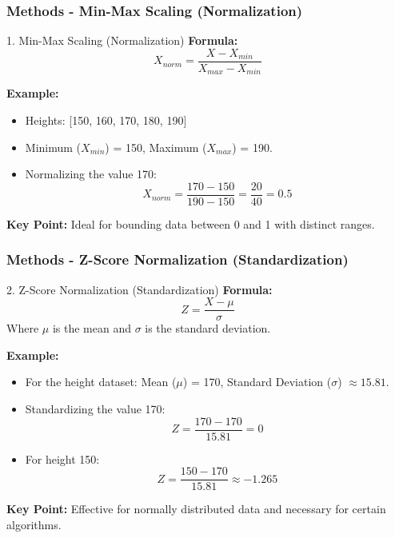 \documentclass[aspectratio=169]{beamer}
\begin{document}
\begin{frame}[fragile]
    \frametitle{Methods - Min-Max Scaling (Normalization)}
    \begin{block}{1. Min-Max Scaling (Normalization)}
        \textbf{Formula:} 
        \begin{equation}
            X_{norm} = \frac{X - X_{min}}{X_{max} - X_{min}}
        \end{equation}

        \textbf{Example:}
        \begin{itemize}
            \item Heights: [150, 160, 170, 180, 190]
            \item Minimum (\(X_{min}\)) = 150, Maximum (\(X_{max}\)) = 190.
            \item Normalizing the value 170:
            \begin{equation}
                X_{norm} = \frac{170 - 150}{190 - 150} = \frac{20}{40} = 0.5
            \end{equation}
        \end{itemize}
        \textbf{Key Point:} Ideal for bounding data between 0 and 1 with distinct ranges.
    \end{block}
\end{frame}

\begin{frame}[fragile]
    \frametitle{Methods - Z-Score Normalization (Standardization)}
    \begin{block}{2. Z-Score Normalization (Standardization)}
        \textbf{Formula:} 
        \begin{equation}
            Z = \frac{X - \mu}{\sigma}
        \end{equation}
        Where \( \mu \) is the mean and \( \sigma \) is the standard deviation.

        \textbf{Example:}
        \begin{itemize}
            \item For the height dataset: Mean (\(\mu\)) = 170, Standard Deviation (\(\sigma\)) \(\approx 15.81\).
            \item Standardizing the value 170:
            \begin{equation}
                Z = \frac{170 - 170}{15.81} = 0
            \end{equation}
            \item For height 150:
            \begin{equation}
                Z = \frac{150 - 170}{15.81} \approx -1.265
            \end{equation}
        \end{itemize}
        \textbf{Key Point:} Effective for normally distributed data and necessary for certain algorithms.
    \end{block}
\end{frame}
\end{document}
